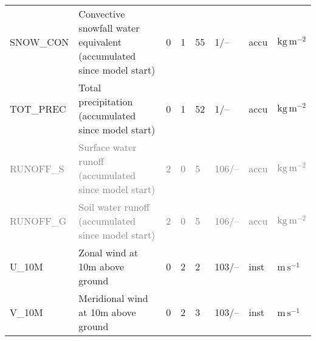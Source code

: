 \begin{longtable}{p{2.0cm}p{5.0cm}p{0.7cm}p{0.7cm}p{0.7cm}p{1.4cm}p{1cm}p{1cm}}
SNOW\_CON                      &  Convective snowfall water equivalent (accumulated since model start)                  &               0                                   &                     1                       &                    55                      &                 1/--                            &                      accu                   &        $\mathrm{kg\,m^{-2}}$    \\
TOT\_PREC                      &  Total precipitation (accumulated since model start)                                   &               0                                   &                     1                       &                    52                      &                 1/--                            &                      accu                   &        $\mathrm{kg\,m^{-2}}$  \\
\textcolor{gray}{RUNOFF\_S}    &  \textcolor{gray}{Surface water runoff (accumulated since model start)}\footnotemark[3]&               \textcolor{gray}{2}                 &                     \textcolor{gray}{0}     &                     \textcolor{gray}{5}    &                 \textcolor{gray}{106/--}        &                      \textcolor{gray}{accu} &        \textcolor{gray}{$\mathrm{kg\,m^{-2}}$}  \\
\textcolor{gray}{RUNOFF\_G}    &  \textcolor{gray}{Soil water runoff (accumulated since model start)}\footnotemark[3]   &               \textcolor{gray}{2}                 &                     \textcolor{gray}{0}     &                     \textcolor{gray}{5}    &                 \textcolor{gray}{106/--}        &                      \textcolor{gray}{accu} &        \textcolor{gray}{$\mathrm{kg\,m^{-2}}$}  \\                                      
U\_10M                         &  Zonal wind at 10m above ground                                                        &               0                                   &                     2                       &                     2                      &               103/--                            &                      inst                   &        $\mathrm{m\,s^{-1}}$  \\
V\_10M                         &  Meridional wind at 10m above ground                                                   &               0                                   &                     2                       &                     3                      &               103/--                            &                      inst                   &        $\mathrm{m\,s^{-1}}$  \\

\end{longtable}
